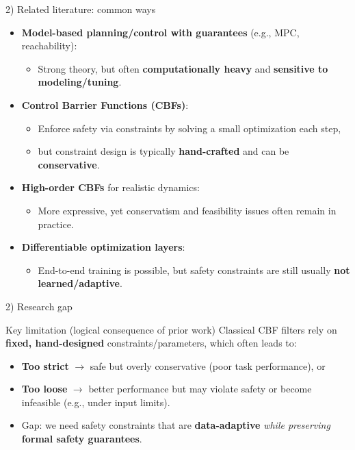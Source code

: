 \documentclass[10pt,aspectratio=169]{beamer}
\begin{document}
\begin{frame}{2) Related literature: common ways}
\begin{itemize}[<+->]
  \item \textbf{Model-based planning/control with guarantees} (e.g., MPC, reachability):
  \begin{itemize}
    \item Strong theory, but often \textbf{computationally heavy} and \textbf{sensitive to modeling/tuning}.
  \end{itemize}
  \item \textbf{Control Barrier Functions (CBFs)}:
  \begin{itemize}
    \item Enforce safety via constraints by solving a small optimization each step,
    \item but constraint design is typically \textbf{hand-crafted} and can be \textbf{conservative}.
  \end{itemize}
  \item \textbf{High-order CBFs} for realistic dynamics:
  \begin{itemize}
    \item More expressive, yet conservatism and feasibility issues often remain in practice.
  \end{itemize}
  \item \textbf{Differentiable optimization layers}:
  \begin{itemize}
    \item End-to-end training is possible, but safety constraints are still usually \textbf{not learned/adaptive}.
  \end{itemize}
\end{itemize}
\end{frame}

\begin{frame}{2) Research gap}
\begin{block}{Key limitation (logical consequence of prior work)}
Classical CBF filters rely on \textbf{fixed, hand-designed} constraints/parameters, which often leads to:
\begin{itemize}
  \item \textbf{Too strict} $\rightarrow$ safe but overly conservative (poor task performance), or
  \item \textbf{Too loose} $\rightarrow$ better performance but may violate safety or become infeasible (e.g., under input limits).
\end{itemize}
\end{block}

\vspace{4pt}
\begin{itemize}
  \item Gap: we need safety constraints that are \textbf{data-adaptive} \emph{while preserving} \textbf{formal safety guarantees}.
\end{itemize}
\end{frame}
\end{document}
